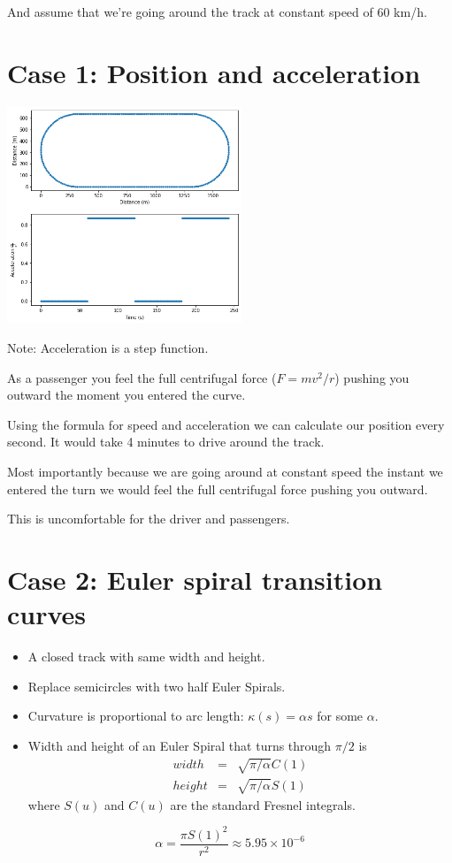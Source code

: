 \documentclass[]{article} %
\theoremstyle{definition}
\theoremstyle{theorem}
\begin{document}
And assume that we're going around the track at constant speed of 60 km/h.

\section{Case 1: Position and acceleration}
\begin{tcolorbox}
	\begin{minipage}{\linewidth}
		\centering
		\includegraphics[width=70mm, scale=0.2]{circular_track.png}
	\end{minipage}
	Note: Acceleration is a step function. 
	
	As a passenger you feel the full centrifugal force ($F=mv^2/r$) pushing you outward the moment you entered the curve. 		
\end{tcolorbox}

Using the formula for speed and acceleration we can calculate our position every second. It would take 4 minutes to drive around the track.

Most importantly because we are going around at constant speed the instant we entered the turn we would feel the full centrifugal force pushing you outward.

This is uncomfortable for the driver and passengers. 

\section{Case 2: Euler spiral transition curves}
\begin{tcolorbox}
	\begin{itemize}
		\item A closed track with same width and height. 
		\item Replace semicircles with two half Euler Spirals.
		\item Curvature is proportional to arc length: $\kappa(s) = \alpha s $ for some $\alpha$.
		\item Width and height of an Euler Spiral that turns through $\pi/2$ is 
		\begin{eqnarray*}
			width &=& \sqrt{\pi / \alpha} C(1) \\
			height &=& \sqrt{\pi /\alpha} S(1)
		\end{eqnarray*}
		where $S(u)$ and $C(u)$ are the standard Fresnel integrals.
	\end{itemize}
	\[
		\alpha = \frac{\pi S(1)^2}{r^2} \approx 5.95 \times 10 ^{-6}
	\]
\end{tcolorbox}
\end{document}
